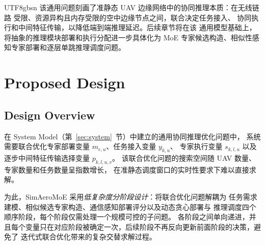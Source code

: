 \documentclass[conference]{IEEEtran}
\begin{document}
\begin{CJK*}{UTF8}{gbsn}
该通用问题刻画了准静态 UAV 边缘网络中的协同推理本质：在无线链路
受限、资源异构且内存受限的空中边缘节点之间，联合决定任务接入、
协同执行和中间特征传输，以降低端到端推理延迟。后续章节将在该
通用模型基础上，将抽象的推理模块部署和执行分配进一步具体化为
MoE 专家候选构造、相似性感知专家部署和逐层单跳推理调度问题。


\section{Proposed Design}
\label{sec:design}

\subsection{Design Overview}
\label{sec:design_overview}

在 System Model（第~\ref{sec:system}~节）中建立的通用协同推理优化问题中，
系统需要联合优化专家部署变量 $m_{e,u}$、任务接入变量 $y_{k,u}$、
专家执行变量 $s_{k,l,u}$ 以及逐步中间特征传输选择变量 $p_{k,l,u,v}$。
该联合优化问题的搜索空间随 UAV 数量、专家数量和任务数量呈指数增长，
在准静态调度窗口的实时性要求下难以直接求解。

为此，SimAeroMoE 采用\emph{低复杂度分阶段设计}：将联合优化问题解耦为
任务需求建模、相似候选专家构造、通信感知部署评分以及动态贪心部署与
推理调度四个顺序阶段，每个阶段仅需处理一个规模可控的子问题。
各阶段之间单向递进，并且每个变量只在对应阶段被确定一次，后续阶段不再反向更新前面阶段的决策，避免了
迭代式联合优化带来的复杂交替求解过程。


\end{CJK*}
\end{document}
